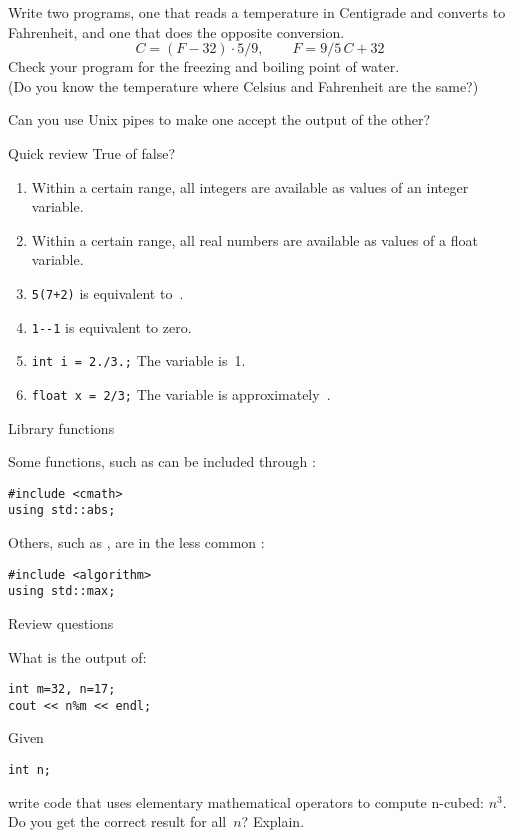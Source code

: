 \begin{exercise}
  \label{ex:C2F}
  Write two programs, one that reads a temperature in Centigrade and
  converts to Fahrenheit, and one that does the opposite conversion.
  \[ C = (F-32)\cdot 5/9,\qquad F = 9/5\,C+32 \]
  Check your program for the freezing and boiling point of water.\\
  (Do you know the temperature where Celsius and Fahrenheit are the
  same?)
  
  Can you use Unix pipes to make one accept the output of the other?
\end{exercise}

\begin{exercise}{Quick review}
  \label{q:vartypes}
  True of false?
  \begin{enumerate}
  \item Within a certain range, all integers are available as values of an
    integer variable.
  \item Within a certain range, all real numbers are available as values of a
    float variable.
  \item \verb-5(7+2)- is equivalent to~.
  \item \verb+1--1+ is equivalent to zero.
  \item \verb-int i = 2./3.;- The variable  is~1.
  \item \verb-float x = 2/3;- The variable  is approximately~.
  \end{enumerate}
\end{exercise}

 {Library functions}

Some functions, such as  can be included through :
\begin{verbatim}
#include <cmath>
using std::abs;
\end{verbatim}
Others, such as , are in the less common :
\begin{verbatim}
#include <algorithm>
using std::max;
\end{verbatim}

 {Review questions}

\begin{exercise}
  \label{ex:cpp-mod}
What is the output of:
\begin{verbatim}
int m=32, n=17;
cout << n%m << endl;
\end{verbatim}
\end{exercise}

\begin{exercise}
  \label{ex:cpp-cube}
  Given
\begin{verbatim}
int n;
\end{verbatim}
write code that
uses elementary mathematical operators to compute n-cubed: $n^3$.
Do you get the correct result for all~$n$? Explain.
\end{exercise}
